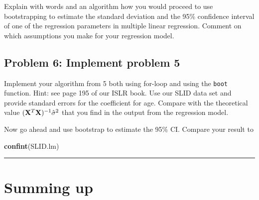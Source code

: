 \documentclass[]{article}
\newenvironment{Shaded}{\begin{snugshade}}{\end{snugshade}}
\newcommand{\DataTypeTok}[1]{\textcolor[rgb]{0.13,0.29,0.53}{#1}}
\newcommand{\DecValTok}[1]{\textcolor[rgb]{0.00,0.00,0.81}{#1}}
\newcommand{\KeywordTok}[1]{\textcolor[rgb]{0.13,0.29,0.53}{\textbf{#1}}}
\newcommand{\NormalTok}[1]{#1}
\newcommand{\OperatorTok}[1]{\textcolor[rgb]{0.81,0.36,0.00}{\textbf{#1}}}
\newcommand{\StringTok}[1]{\textcolor[rgb]{0.31,0.60,0.02}{#1}}
\begin{document}
Explain with words and an algorithm how you would proceed to use
bootstrapping to estimate the standard deviation and the 95\% confidence
interval of one of the regression parameters in multiple linear
regression. Comment on which assumptions you make for your regression
model.

\hypertarget{problem-6-implement-problem-5}{%
\subsection{Problem 6: Implement problem
5}\label{problem-6-implement-problem-5}}

Implement your algorithm from 5 both using for-loop and using the
\texttt{boot} function. Hint: see page 195 of our ISLR book. Use our
SLID data set and provide standard errors for the coefficient for age.
Compare with the theoretical value
\(({\bf X}^T{\bf X})^{-1}\hat{\sigma}^2\) that you find in the output
from the regression model.

\begin{Shaded}
\end{Shaded}

Now go ahead and use bootstrap to estimate the 95\% CI. Compare your
result to

\begin{Shaded}
\begin{Highlighting}[]
\KeywordTok{confint}\NormalTok{(SLID.lm)}
\end{Highlighting}
\end{Shaded}

\begin{center}\rule{0.5\linewidth}{0.5pt}\end{center}

\hypertarget{summing-up}{%
\section{Summing up}\label{summing-up}}
\end{document}

